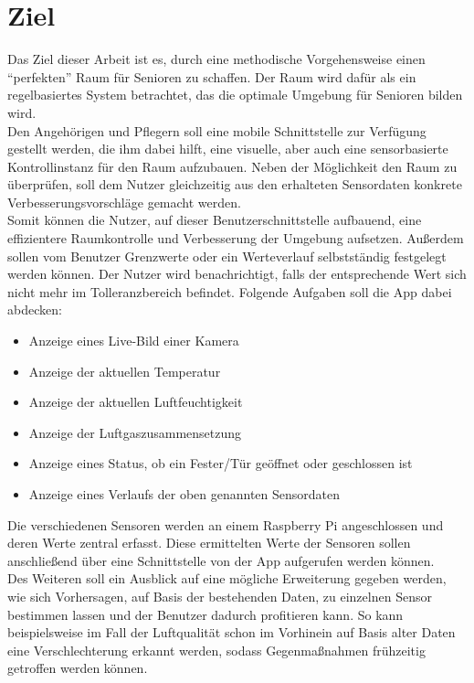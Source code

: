 \section{Ziel}
Das Ziel dieser Arbeit ist es, durch eine methodische Vorgehensweise einen ``perfekten'' Raum für Senioren zu schaffen. Der Raum wird dafür als ein regelbasiertes System betrachtet, das die optimale Umgebung für Senioren bilden wird.\\Den Angehörigen und Pflegern soll eine mobile Schnittstelle zur Verfügung gestellt werden, die ihm dabei hilft, eine visuelle, aber auch eine sensorbasierte Kontrollinstanz für den Raum aufzubauen. Neben der Möglichkeit den Raum zu überprüfen, soll dem Nutzer gleichzeitig aus den erhalteten Sensordaten konkrete Verbesserungsvorschläge gemacht werden.\\
Somit können die Nutzer, auf dieser Benutzerschnittstelle aufbauend, eine effizientere Raumkontrolle und Verbesserung der Umgebung aufsetzen.
Außerdem sollen vom Benutzer Grenzwerte oder ein Werteverlauf selbstständig festgelegt werden können. Der Nutzer wird benachrichtigt, falls der entsprechende Wert sich nicht mehr im Tolleranzbereich befindet. 
Folgende Aufgaben soll die App dabei abdecken:
\begin{itemize}
	\item Anzeige eines Live-Bild einer Kamera
	\item Anzeige der aktuellen Temperatur
	\item Anzeige der aktuellen Luftfeuchtigkeit
	\item Anzeige der Luftgaszusammensetzung
	\item Anzeige eines Status, ob ein Fester/Tür geöffnet oder geschlossen ist
	\item Anzeige eines Verlaufs der oben genannten Sensordaten
\end{itemize} 
Die verschiedenen Sensoren werden an einem Raspberry Pi angeschlossen und deren Werte zentral erfasst. Diese ermittelten Werte der Sensoren sollen anschließend über eine Schnittstelle von der App aufgerufen werden können. 
\\
Des Weiteren soll ein Ausblick auf eine mögliche Erweiterung gegeben werden, wie sich Vorhersagen, auf Basis der bestehenden Daten, zu einzelnen Sensor bestimmen lassen und der Benutzer dadurch profitieren kann. So kann beispielsweise im Fall der Luftqualität schon im Vorhinein auf Basis alter Daten eine Verschlechterung erkannt werden, sodass Gegenmaßnahmen frühzeitig getroffen werden können.

